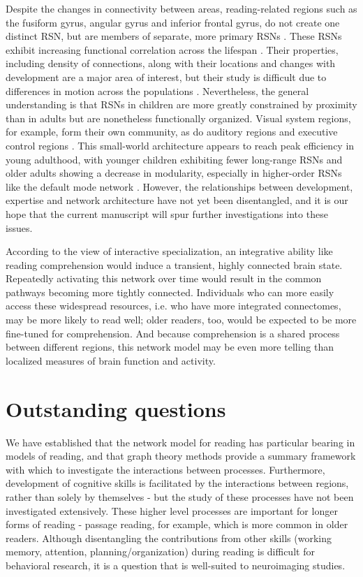 Despite the changes in connectivity between areas, reading-related regions such as the fusiform gyrus, angular gyrus and inferior frontal gyrus, do not create one distinct RSN, but are members of separate, more primary RSNs \citep{Vogel2013}. These RSNs exhibit increasing functional correlation across the lifespan \citep{Kesler2013, Uddin2010}. Their properties, including density of connections, along with their locations and changes with development are a major area of interest, but their study is difficult due to differences in motion across the populations \cite{Power2013}. Nevertheless, the general understanding is that RSNs in children are more greatly constrained by proximity than in adults but are nonetheless functionally organized. Visual system regions, for example, form their own community, as do auditory regions and executive control regions \citep{Seeley2007}. This small-world architecture appears to reach peak efficiency in young adulthood, with younger children exhibiting fewer long-range RSNs and older adults showing a decrease in modularity, especially in higher-order RSNs like the default mode network \citep{Cao2017}. However, the relationships between development, expertise and network architecture have not yet been disentangled, and it is our hope that the current manuscript will spur further investigations into these issues. 

According to the view of interactive specialization, an integrative ability like reading comprehension would induce a transient, highly connected brain state. Repeatedly activating this network over time would result in the common pathways becoming more tightly connected. Individuals who can more easily access these widespread resources, i.e. who have more integrated connectomes, may be more likely to read well; older readers, too, would be expected to be more fine-tuned for comprehension. And because comprehension is a shared process between different regions, this network model may be even more telling than localized measures of brain function and activity. 


\section{Outstanding questions}

We have established that the network model for reading has particular bearing in models of reading, and that graph theory methods provide a summary framework with which to investigate the interactions between processes. Furthermore, development of cognitive skills is facilitated by the interactions between regions, rather than solely by themselves - but the study of these processes have not been investigated extensively. These higher level processes are important for longer forms of reading - passage reading, for example, which is more common in older readers. Although disentangling the contributions from other skills (working memory, attention, planning/organization) during reading is difficult for behavioral research, it is a question that is well-suited to neuroimaging studies. 

